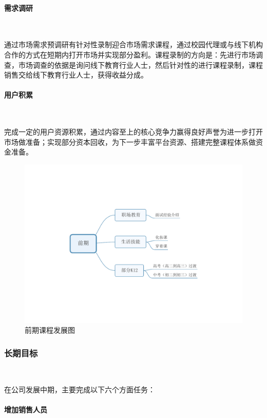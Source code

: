 \paragraph{需求调研}\

通过市场需求预调研有针对性录制迎合市场需求课程，通过校园代理或与线下机构合作的方式在短期内打开市场并实现部分盈利。课程录制的方向是：先进行市场调查，市场调查的依据是询问线下教育行业人士，然后针对性的进行课程录制，课程销售交给线下教育行业人士，获得收益分成。

\paragraph{用户积累}\

完成一定的用户资源积累，通过内容至上的核心竞争力赢得良好声誉为进一步打开市场做准备；实现部分资本回收，为下一步丰富平台资源、搭建完整课程体系做资金准备。

\begin{figure}[H]
	\centering
	\includegraphics[width=0.9\columnwidth]{figures/prophase_development}%
	\caption{前期课程发展图}
	\label{fg:prophase_development}
\end{figure}

\subsubsection{长期目标}\

在公司发展中期，主要完成以下六个方面任务：

\paragraph{增加销售人员}\

